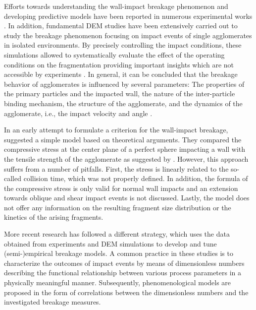 Efforts towards understanding the wall-impact breakage phenomenon and
developing predictive models have been reported in numerous
experimental works
\citep[e.g.,][]{john1993breakup,froeschke2003impact,samimi2004analysis,davies1951impingement}.
In addition, fundamental DEM studies have been extensively carried out
to study the breakage phenomenon focusing on impact events of single
agglomerates in isolated environments. By precisely controlling the
impact conditions, these simulations allowed to systematically
evaluate the effect of the operating conditions on the fragmentation
providing important insights which are not accessible by experiments
\citep[e.g.,][]{thornton1996numerical,ning1997distinct,mishra2001impact,
  moreno2003effect,tong2009numerical}.  In general, it can be
concluded that the breakage behavior of agglomerates is influenced by
several parameters: The properties of the primary particles and the
impacted wall, the nature of the inter-particle binding mechanism, the
structure of the agglomerate, and the dynamics of the agglomerate,
i.e., the impact velocity and angle \citep{ghadiri2007analysis}. 
\newline

In an early attempt to formulate a criterion for the wall-impact
breakage, \citet{kousaka1979dispersion} suggested a simple model based
on theoretical arguments. They compared the compressive stress at the
center plane of a perfect sphere impacting a wall with the tensile
strength of the agglomerate as suggested by \citet{rumpf1962}.
However, this approach suffers from a number of pitfalls. First, the
stress is linearly related to the so-called collision time, which was
not properly defined. In addition, the formula of the compressive
stress is only valid for normal wall impacts and an extension towards
oblique and shear impact events is not discussed. Lastly, the model
does not offer any information on the resulting fragment size
distribution or the kinetics of the arising fragments.  \newline 

More recent research has followed a different strategy, which uses the
data obtained from experiments and DEM simulations to develop and tune
(semi-)empirical breakage models. A common practice in these studies
is to characterize the outcomes of impact events by means of
dimensionless numbers describing the functional relationship between
various process parameters in a physically meaningful manner.
Subsequently, phenomenological models are proposed in the form of
correlations between the dimensionless numbers and the investigated
breakage measures.

